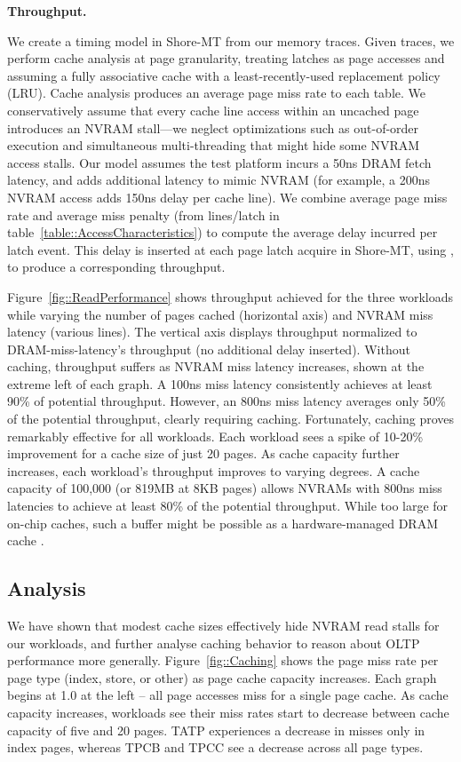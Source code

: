 \textbf{Throughput.}

We create a timing model in Shore-MT from our memory traces.
Given traces, we perform cache analysis at page granularity, treating latches as page accesses and assuming a fully associative cache with a least-recently-used replacement policy (LRU).
Cache analysis produces an average page miss rate to each table.
We conservatively assume that every cache line access within an uncached page introduces an NVRAM stall---we neglect optimizations such as out-of-order execution and simultaneous multi-threading that might hide some NVRAM access stalls. 
Our model assumes the test platform incurs a 50ns DRAM fetch latency, and adds additional latency to mimic NVRAM (for example, a 200ns NVRAM access adds 150ns delay per cache line).
We combine average page miss rate and average miss penalty (from lines/latch in table~\ref{table::AccessCharacteristics}) to compute the average delay incurred per latch event.
This delay is inserted at each page latch acquire in Shore-MT, using \InPlace, to produce a corresponding throughput.

Figure~\ref{fig::ReadPerformance} shows throughput achieved for the three workloads while varying the number of pages cached (horizontal axis) and NVRAM miss latency (various lines).
The vertical axis displays throughput normalized to DRAM-miss-latency's throughput (no additional delay inserted).
Without caching, throughput suffers as NVRAM miss latency increases, shown at the extreme left of each graph.
A 100ns miss latency consistently achieves at least 90\% of potential throughput.
However, an 800ns miss latency averages only 50\% of the potential throughput, clearly requiring caching.
Fortunately, caching proves remarkably effective for all workloads.
Each workload sees a spike of 10-20\% improvement for a cache size of just 20 pages.
As cache capacity further increases, each workload's throughput improves to varying degrees.
A cache capacity of 100,000 (or 819MB at 8KB pages) allows NVRAMs with 800ns miss latencies to achieve at least 80\% of the potential throughput.
While too large for on-chip caches, such a buffer might be possible as a hardware-managed DRAM cache \cite{QureshiSrinivasan09}.

\subsection{Analysis}
\label{sec:OLTP_eval:Reads:Analysis}

We have shown that modest cache sizes effectively hide NVRAM read stalls for our workloads, and further analyse caching behavior to reason about OLTP performance more generally.
Figure~\ref{fig::Caching} shows the page miss rate per page type (index, store, or other) as page cache capacity increases.
Each graph begins at 1.0 at the left -- all page accesses miss for a single page cache.
As cache capacity increases, workloads see their miss rates start to decrease between cache capacity of five and 20 pages.
TATP experiences a decrease in misses only in index pages, whereas TPCB and TPCC see a decrease across all page types.

